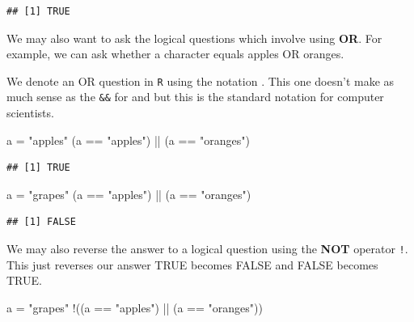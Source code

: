 \documentclass[
]{book}
\newenvironment{Shaded}{\begin{snugshade}}{\end{snugshade}}
\newcommand{\NormalTok}[1]{#1}
\newcommand{\OtherTok}[1]{\textcolor[rgb]{0.56,0.35,0.01}{#1}}
\newcommand{\SpecialCharTok}[1]{\textcolor[rgb]{0.00,0.00,0.00}{#1}}
\newcommand{\StringTok}[1]{\textcolor[rgb]{0.31,0.60,0.02}{#1}}
\theoremstyle{definition}
\theoremstyle{definition}
\theoremstyle{definition}
\theoremstyle{definition}
\theoremstyle{remark}
\begin{document}
\begin{verbatim}
## [1] TRUE
\end{verbatim}

We may also want to ask the logical questions which involve using \textbf{OR}. For example, we can ask whether a character equals apples OR oranges.

We denote an OR question in \texttt{R} using the notation \texttt{\textbar{}\textbar{}}. This one doesn't make as much sense as the \texttt{\&\&} for and but this is the standard notation for computer scientists.

\begin{Shaded}
\begin{Highlighting}[]
\NormalTok{a }\OtherTok{=} \StringTok{"apples"}
\NormalTok{(a }\SpecialCharTok{==} \StringTok{"apples"}\NormalTok{) }\SpecialCharTok{||}\NormalTok{ (a }\SpecialCharTok{==} \StringTok{"oranges"}\NormalTok{)}
\end{Highlighting}
\end{Shaded}

\begin{verbatim}
## [1] TRUE
\end{verbatim}

\begin{Shaded}
\begin{Highlighting}[]
\NormalTok{a }\OtherTok{=} \StringTok{"grapes"}
\NormalTok{(a }\SpecialCharTok{==} \StringTok{"apples"}\NormalTok{) }\SpecialCharTok{||}\NormalTok{ (a }\SpecialCharTok{==} \StringTok{"oranges"}\NormalTok{)}
\end{Highlighting}
\end{Shaded}

\begin{verbatim}
## [1] FALSE
\end{verbatim}

We may also reverse the answer to a logical question using the \textbf{NOT} operator \texttt{!}. This just reverses our answer TRUE becomes FALSE and FALSE becomes TRUE.

\begin{Shaded}
\begin{Highlighting}[]
\NormalTok{a }\OtherTok{=} \StringTok{"grapes"}
\SpecialCharTok{!}\NormalTok{((a }\SpecialCharTok{==} \StringTok{"apples"}\NormalTok{) }\SpecialCharTok{||}\NormalTok{ (a }\SpecialCharTok{==} \StringTok{"oranges"}\NormalTok{))}
\end{Highlighting}
\end{Shaded}
\end{document}
